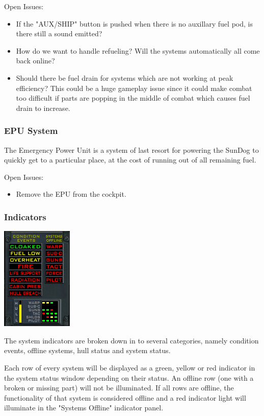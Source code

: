 Open Issues:
\begin{itemize}
\item If the "AUX\slash SHIP" button is pushed when there is no auxillary
fuel pod, is there still a sound emitted?
\item How do we want to handle refueling?  Will the systems automatically
all come back online?
\item Should there be fuel drain for systems which are not working at
peak efficiency?  This could be a huge gameplay issue since it could make
combat too difficult if parts are popping in the middle of combat which
causes fuel drain to increase.
\end{itemize}

\subsubsection{EPU System}

The Emergency Power Unit is a system of last resort for powering the
SunDog to quickly get to a particular place, at the cost of running
out of all remaining fuel.

Open Issues:
\begin{itemize}
\item Remove the EPU from the cockpit.
\end{itemize}

\subsubsection{Indicators}
\includegraphics[scale=0.70]{images/indicators.png}

The system indicators are broken down in to several categories, namely
condition events, offline systems, hull status and system status.

Each row of every system will be displayed as a green, yellow or red
indicator in the system status window depending on their status.  An
offline row (one with a broken or missing part) will not be illuminated.
If all rows are offline, the functionality of that system is considered
offline and a red indicator light will illuminate in the "Systems Offline"
indicator panel.

